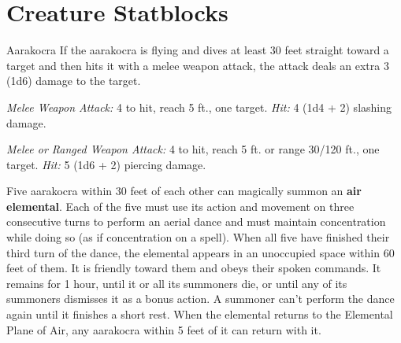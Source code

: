 \documentclass[10pt,a4paper,twoside,bg=print,twocolumn,openany,nodeprecatedcode]{dndbook}
\begin{document}
\appendix

\chapter{Creature Statblocks}

\pagestyle{empty}

\begin{DndMonster}[float=t]{Aarakocra}
\DndMonsterBasics[
armor-class = {12},
hit-points = {\DndDice{3d8}},
speed = {20 ft., fly 50 ft.}
]
\DndMonsterAbilityScores[
 str = 10,
 dex = 14,
 con = 10,
 int = 11,
 wis = 12,
 cha = 11
]
\DndMonsterDetails[
skills = {Perception +5},
languages = {Auran, Aarakocra},
challenge = 1/4,
]
If the aarakocra is flying and dives at least 30 feet straight toward a target and then hits it with a melee weapon attack, the attack deals an extra 3 (1d6) damage to the target.

\textsl{Melee Weapon Attack:} 4 to hit, reach 5 ft., one target. \textsl{Hit:} 4 (1d4 + 2) slashing damage.

\textsl{Melee or Ranged Weapon Attack:} 4 to hit, reach 5 ft. or range 30/120 ft., one target. \textsl{Hit:} 5 (1d6 + 2) piercing damage.

Five aarakocra within 30 feet of each other can magically summon an \textbf{air elemental}. Each of the five must use its action and movement on three consecutive turns to perform an aerial dance and must maintain concentration while doing so (as if concentration on a spell). When all five have finished their third turn of the dance, the elemental appears in an unoccupied space within 60 feet of them. It is friendly toward them and obeys their spoken commands. It remains for 1 hour, until it or all its summoners die, or until any of its summoners dismisses it as a bonus action. A summoner can't perform the dance again until it finishes a short rest. When the elemental returns to the Elemental Plane of Air, any aarakocra within 5 feet of it can return with it.

\end{DndMonster}
\end{document}
